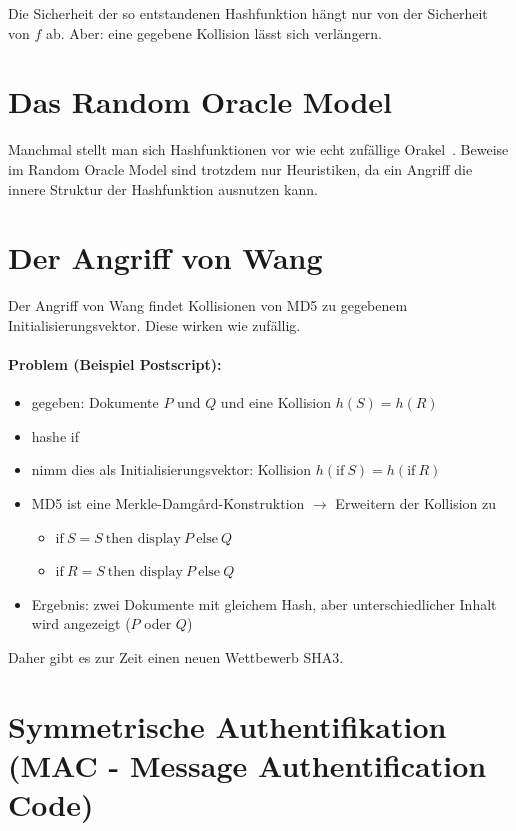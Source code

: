 \documentclass[a4paper,twoside,DIV15,BCOR12mm]{scrbook}
\begin{document}
Die Sicherheit der so entstandenen Hashfunktion hängt nur von der Sicherheit von $f$ ab. Aber: eine gegebene Kollision lässt sich verlängern.

\section{Das Random Oracle Model}

Manchmal stellt man sich Hashfunktionen vor wie echt zufällige \glqq Orakel\grqq\ . Beweise im Random Oracle Model sind trotzdem nur Heuristiken, da ein Angriff die innere Struktur der Hashfunktion ausnutzen kann.

\section{Der Angriff von Wang}

Der Angriff von Wang findet Kollisionen von MD5 zu gegebenem Initialisierungsvektor. Diese wirken wie zufällig.

\paragraph{Problem (Beispiel Postscript):}

\begin{itemize}
	\item gegeben: Dokumente $P$ und $Q$ und eine Kollision $h(S) = h(R)$
	\item hashe \glqq if\grqq\
	\item nimm dies als Initialisierungsvektor: Kollision $h(\text{if}\ S) = h(\text{if}\ R)$
	\item MD5 ist eine Merkle-Damg\r{a}rd-Konstruktion $\rightarrow$ Erweitern der Kollision zu
		\begin{itemize}
			\item $\text{if}\ S=S\ \text{then display}\ P\ \text{else}\ Q$
			\item $\text{if}\ R=S\ \text{then display}\ P\ \text{else}\ Q$
		\end{itemize}
	\item Ergebnis: zwei Dokumente mit gleichem Hash, aber unterschiedlicher Inhalt wird angezeigt ($P$ oder $Q$)
\end{itemize}

Daher gibt es zur Zeit einen neuen Wettbewerb SHA3.

\section{Symmetrische Authentifikation (MAC - Message Authentification Code)} \label{mac}
\end{document}
